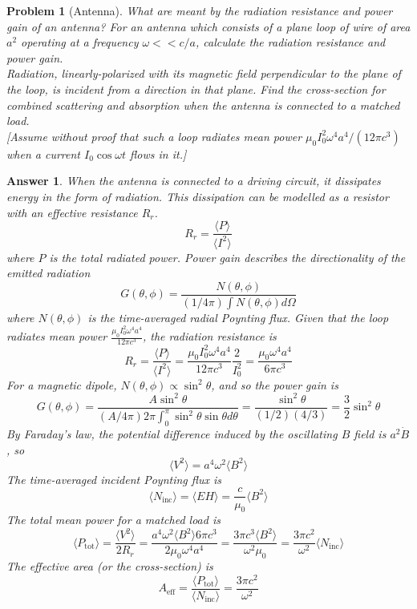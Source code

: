 \documentclass[a4paper]{article}
\newtheorem{ans}{Answer}
\theoremstyle{new}
\newtheorem{qns}{Problem}
\begin{document}
\newpage
\begin{qns}[Antenna]
What are meant by the radiation resistance and power gain of an antenna? For an antenna which consists of a plane loop of wire of area $a^2$ operating at a frequency $\omega<<c/a$, calculate the radiation resistance and power gain.\\[5pt]
Radiation, linearly-polarized with its magnetic field perpendicular to the plane of the loop, is incident from a direction in that plane. Find the cross-section for combined scattering and absorption when the antenna is connected to a matched load.\\[5pt]
[Assume without proof that such a loop radiates mean power $\mu_0I_0^2\omega^4a^4/(12\pi c^3)$ when a current $I_0\cos\omega t$ flows in it.]
\end{qns}
\begin{ans}
When the antenna is connected to a driving circuit, it dissipates energy in the form of radiation. This dissipation can be modelled as a resistor with an effective resistance $R_r$. 
$$R_r=\frac{\langle P\rangle}{\langle I^2\rangle}$$
where $P$ is the total radiated power. Power gain describes the directionality of the emitted radiation
$$G(\theta,\phi)=\frac{N(\theta,\phi)}{(1/4\pi)\int N(\theta,\phi)d\Omega}$$
where $N(\theta,\phi)$ is the time-averaged radial Poynting flux. Given that the loop radiates mean power $\frac{\mu_0I_0^2\omega^4a^4}{12\pi c^3}$, the radiation resistance is
$$R_r=\frac{\langle P\rangle}{\langle I^2\rangle}=\frac{\mu_0I_0^2\omega^4a^4}{12\pi c^3}\frac{2}{I_0^2}=\frac{\mu_0\omega^4a^4}{6\pi c^3}$$
For a magnetic dipole, $N(\theta,\phi)\propto\sin^2\theta$, and so the power gain is
$$G(\theta,\phi)=\frac{A\sin^2\theta}{(A/4\pi)2\pi\int_0^\pi\sin^2\theta\sin\theta d\theta}=\frac{\sin^2\theta}{(1/2)(4/3)}=\frac{3}{2}\sin^2\theta$$
By Faraday's law, the potential difference induced by the oscillating $B$ field is $a^2\dot{B}$, so
$$\langle V^2\rangle=a^4\omega^2\langle B^2\rangle$$
The time-averaged incident Poynting flux is
$$\langle N_{\text{inc}}\rangle=\langle EH\rangle=\frac{c}{\mu_0}\langle B^2\rangle$$
The total mean power for a matched load is
$$\langle P_{\text{tot}}\rangle=\frac{\langle V^2\rangle}{2R_r}=\frac{a^4\omega^2\langle B^2\rangle6\pi c^3}{2\mu_0\omega^4a^4}=\frac{3\pi c^3\langle B^2\rangle}{\omega^2\mu_0}=\frac{3\pi c^2}{\omega^2}\langle N_{\text{inc}}\rangle$$
The effective area (or the cross-section) is
$$A_{\text{eff}}=\frac{\langle P_{\text{tot}}\rangle}{\langle N_{\text{inc}}\rangle}=\frac{3\pi c^2}{\omega^2}$$
\end{ans}
\end{document}
